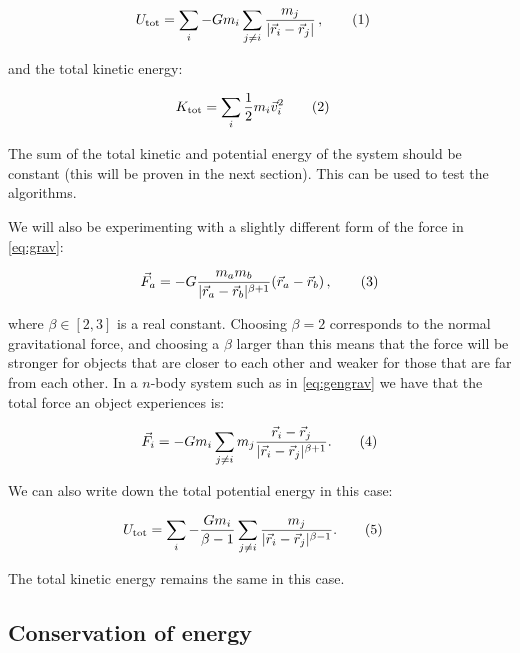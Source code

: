 \documentclass[reprint,english,notitlepage]{revtex4-1}  %
\newcommand\numberthis{\addtocounter{equation}{1}\tag{\theequation}}
\begin{document}
\begin{align*}
U_\text{tot} &= \sum\limits_i - G m_i \sum\limits_{j\neq i} \frac{m_j}{|\vec{r}_i - \vec{r}_j|} \, , \numberthis \label{eq:tot_pot_en}
\end{align*}

and the total kinetic energy:

\begin{align*}
K_\text{tot} &= \sum\limits_i \frac{1}{2}m_i \vec{v}_i^2 \numberthis \label{eq:tot_kin_en}
\end{align*}

The sum of the total kinetic and potential energy of the system should be constant (this will be proven in the next section). This can be used to test the algorithms.

We will also be experimenting with a slightly different form of the force in \eqref{eq:grav}:

\begin{align*}
\vec{F}_a = - G \frac{m_a m_b}{|\vec{r}_a - \vec{r}_b|^{\beta + 1} } ( \vec{r}_a - \vec{r}_b) \, , \numberthis \label{eq:beta_grav}
\end{align*}

where $\beta \in [2,3]$ is a real constant. Choosing $\beta = 2$ corresponds to the normal gravitational force, and choosing a $\beta$ larger than this means that the force will be stronger for objects that are closer to each other and weaker for those that are far from each other. In a $n$-body system such as in \eqref{eq:gengrav} we have that the total force an object experiences is:

\begin{align*}
\vec{F}_{i} = -Gm_{i}\sum_{j\neq i}m_{j}\frac{\vec{r}_{i}-\vec{r}_{j}}{|\vec{r}_{i}-\vec{r}_{j}|^{\beta + 1}}. \numberthis \label{eq:beta_gengrav}
\end{align*}

We can also write down the total potential energy in this case:

\begin{align*}
U_\text{tot} &= \sum\limits_i - \frac{G m_i}{\beta - 1} \sum\limits_{j\neq i} \frac{m_j}{|\vec{r}_i - \vec{r}_j|^{\beta-1}} . \numberthis \label{eq:beta_tot_pot_en}
\end{align*}

The total kinetic energy remains the same in this case.

\subsection{Conservation of energy} \label{sec:II:c}
\end{document}
